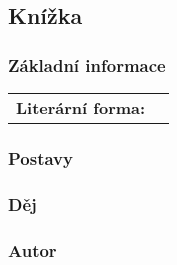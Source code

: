 \subsection{Knížka}
\subsubsection{Základní informace}
\begin{center}
    \begin{tabular}{ c|c }
        \textbf{Literární forma:} & \\
    \end{tabular}
\end{center}
\subsubsection{Postavy}
\subsubsection{Děj}
\subsubsection{Autor}